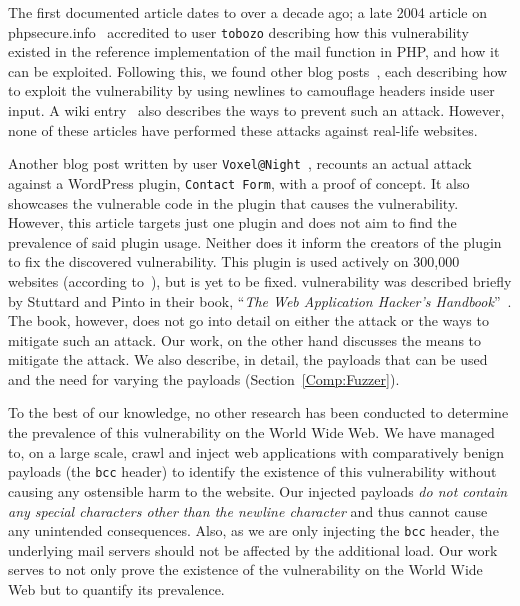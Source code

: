 The first documented article dates to over a decade ago; a late 2004 article on phpsecure.info~\cite{Tobozo} accredited to user \lstinline|tobozo| describing how this vulnerability existed in the reference implementation of the mail function in PHP, and how it can be exploited. Following this, we found other blog posts~\cite{Calin,DK,Injection2,Nicol,Pope}, each describing how to exploit the vulnerability by using newlines to camouflage headers inside user input. A wiki entry~\cite{Injection} also describes the ways to prevent such an attack. However, none of these articles have performed these attacks against real-life websites.

Another blog post written by user \lstinline|Voxel@Night|~\cite{Tendencies2014}, recounts an actual attack against a WordPress plugin, \texttt{Contact Form}, with a proof of concept\footnotemark. It also showcases the vulnerable code in the plugin that causes the vulnerability. However, this article targets just one plugin and does not aim to find the prevalence of said plugin usage. Neither does it inform the creators of the plugin to fix the discovered vulnerability. This plugin is used actively on 300,000 websites (according to~\cite{BestWebSoft2016}), but is yet to be fixed.
\ehi vulnerability was described briefly by Stuttard and Pinto in their book, ``\emph{The Web Application Hacker's Handbook}''~\cite{stuttard2011web}. The book, however, does not go into detail on either the attack or the ways to mitigate such an attack. Our work, on the other hand discusses the means to mitigate the attack. We also describe, in detail, the payloads that can be used and the need for varying the payloads (Section~\ref{Comp:Fuzzer}).

To the best of our knowledge, no other research has been conducted to determine the prevalence of this vulnerability on the World Wide Web. We have managed to, on a large scale, crawl and inject web applications with comparatively benign payloads (the \texttt{bcc} header) to identify the existence of this vulnerability without causing any ostensible harm to the website. Our injected payloads \emph{do not contain any special characters other than the newline character} and thus cannot cause any unintended consequences. Also, as we are only injecting the \texttt{bcc} header, the underlying mail servers should not be affected by the additional load. Our work serves to not only prove the existence of the vulnerability on the World Wide Web but to quantify its prevalence.
